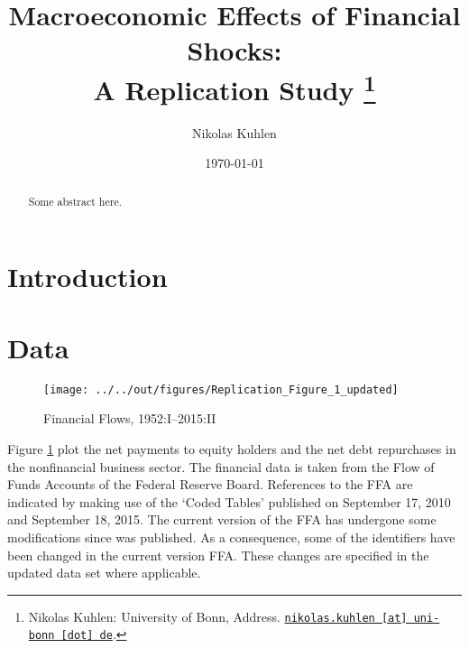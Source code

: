 \documentclass[12pt,a4paper,leqno]{article}
\begin{document}
\title{Macroeconomic Effects of Financial Shocks: \\A Replication Study
\thanks{Nikolas Kuhlen: University of Bonn, Address. \href{mailto:nikolas.kuhlen@uni-bonn.de} {\nolinkurl{nikolas.kuhlen [at] uni-bonn [dot] de}}.}
}

\author{Nikolas Kuhlen
}

\date{\today}

\maketitle


\begin{abstract}
	Some abstract here.
\end{abstract}
\clearpage

\section{Introduction} %
\label{sec:introduction}

\section{Data} %
\label{sec:data}


\begin{figure}
    
    \texttt{[image: ../../out/figures/Replication\_Figure\_1\_updated]}

    \caption{Financial Flows, 1952:I--2015:II}

    \label{fig:figure_1}

\end{figure}


Figure \ref{fig:figure_1} plot the net payments to equity holders and the net debt repurchases in the nonfinancial business sector. The financial data is taken from the Flow of Funds Accounts of the Federal Reserve Board. References to the FFA are indicated by making use of the ‘Coded Tables’ published on September 17, 2010 and September 18, 2015. The current version of the FFA has undergone some modifications since \citet{JERMANNfinancial} was published. As a consequence, some of the identifiers have been changed in the current  version FFA. These changes are specified in the updated data set where applicable.
\end{document}
